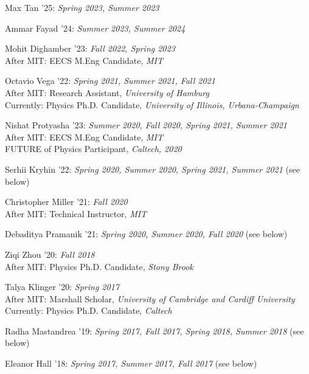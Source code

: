 \bbl

\item Max Tan '25: \emph{Spring 2023, Summer 2023}

\item Ammar Fayad '24: \emph{Summer 2023, Summer 2024}

\item Mohit Dighamber '23: \emph{Fall 2022, Spring 2023}
\\ After MIT: EECS M.Eng Candidate, \emph{MIT}

\item Octavio Vega '22: \emph{Spring 2021, Summer 2021, Fall 2021}
\\ After MIT: Research Assistant, \emph{University of Hamburg}
\\ Currently: Physics Ph.D. Candidate, \emph{University of Illinois, Urbana-Champaign}

\item Nishat Protyasha '23: \emph{Summer 2020, Fall 2020, Spring 2021, Summer 2021}
\\ After MIT: EECS M.Eng Candidate, \emph{MIT}
\\ FUTURE of Physics Participant, \emph{Caltech, 2020}

\item Serhii Kryhin '22: \emph{Spring 2020, Summer 2020, Spring 2021, Summer 2021} (see below) 

\item Christopher Miller '21: \emph{Fall 2020}
\\ After MIT: Technical Instructor, \emph{MIT}

\item Debaditya Pramanik '21: \emph{Spring 2020, Summer 2020, Fall 2020} (see below) 

\item Ziqi Zhou '20: \emph{Fall 2018}
\\ After MIT: Physics Ph.D. Candidate, \emph{Stony Brook}

\item Talya Klinger '20: \emph{Spring 2017}
\\ After MIT: Marshall Scholar, \emph{University of Cambridge and Cardiff University}
\\ Currently: Physics Ph.D. Candidate, \emph{Caltech}

\item Radha Mastandrea '19: \emph{Spring 2017, Fall 2017, Spring 2018, Summer 2018} (see below) 

\item Eleanor Hall '18: \emph{Spring 2017, Summer 2017, Fall 2017} (see below) 

